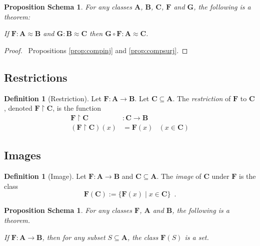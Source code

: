 \documentclass{book}
\let\qed\relax
\newtheorem{props}[ax]{Proposition Schema}
\theoremstyle{definition}
\newtheorem{df}[ax]{Definition}
\begin{document}
\begin{props}
\label{prop:compbij}
For any classes $\mathbf{A}$, $\mathbf{B}$, $\mathbf{C}$, $\mathbf{F}$ and $\mathbf{G}$, the following is a theorem:

If $\mathbf{F} : \mathbf{A} \approx \mathbf{B}$ and $\mathbf{G} : \mathbf{B} \approx \mathbf{C}$ then $\mathbf{G} \circ \mathbf{F} : \mathbf{A} \approx \mathbf{C}$.
\end{props}

\begin{proof}
\pf\ Propositions \ref{prop:compinj} and \ref{prop:compsurj}. \qed
\end{proof}

\subsection{Restrictions}

\begin{df}[Restriction]
Let $\mathbf{F} : \mathbf{A} \rightarrow \mathbf{B}$. Let $\mathbf{C} \subseteq \mathbf{A}$. The \emph{restriction} of $\mathbf{F}$ to $\mathbf{C}$, denoted $\mathbf{F} \restriction \mathbf{C}$, is the function
\begin{align*}
\mathbf{F} \restriction \mathbf{C} & : \mathbf{C} \rightarrow \mathbf{B} \\
(\mathbf{F} \restriction \mathbf{C})(x) & = \mathbf{F}(x) & (x \in \mathbf{C})
\end{align*}
\end{df}

\subsection{Images}

\begin{df}[Image]
Let $\mathbf{F} : \mathbf{A} \rightarrow \mathbf{B}$ and $\mathbf{C} \subseteq \mathbf{A}$. The \emph{image} of $\mathbf{C}$ under $\mathbf{F}$ is the class
\[ \mathbf{F}(\mathbf{C}) := \{ \mathbf{F}(x) \mid x \in \mathbf{C} \} \enspace . \]
\end{df}

\begin{props}
For any classes $\mathbf{F}$, $\mathbf{A}$ and $\mathbf{B}$, the following is a theorem.

If $\mathbf{F} : \mathbf{A} \rightarrow \mathbf{B}$, then for any subset $S \subseteq \mathbf{A}$, the class $\mathbf{F}(S)$ is a set.
\end{props}
\end{document}
